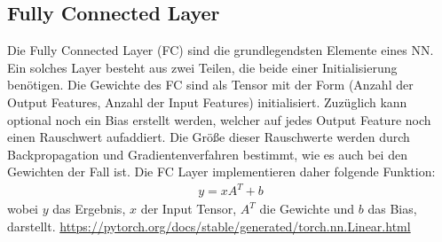 \subsection{Fully Connected Layer} \label{FC_Layers}
Die Fully Connected Layer (FC) sind die grundlegendsten Elemente eines NN. Ein solches Layer besteht aus zwei Teilen, die beide einer Initialisierung benötigen.
Die Gewichte des FC sind als Tensor mit der Form (Anzahl der Output Features, Anzahl der Input Features) initialisiert. Zuzüglich kann optional noch ein Bias erstellt werden, welcher auf jedes Output Feature noch einen Rauschwert aufaddiert. Die Größe dieser Rauschwerte werden durch Backpropagation und Gradientenverfahren bestimmt, wie es auch bei den Gewichten der Fall ist. Die FC Layer implementieren daher folgende Funktion:
\begin{align}
	y = xA^T + b
\end{align}
wobei $y$ das Ergebnis, $x$ der Input Tensor, $A^T$ die Gewichte und $b$ das Bias, darstellt. \url{https://pytorch.org/docs/stable/generated/torch.nn.Linear.html}






